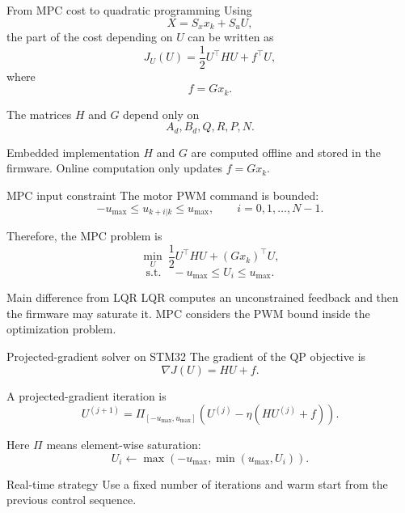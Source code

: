 \documentclass[aspectratio=169]{beamer}
\begin{document}
\begin{frame}{From MPC cost to quadratic programming}
Using
\[
X=S_xx_k+S_uU,
\]
the part of the cost depending on $U$ can be written as
\[
J_U(U)=\frac12U^\top HU+f^\top U,
\]
where
\[
f=Gx_k.
\]

\vspace{0.2cm}

The matrices $H$ and $G$ depend only on
\[
A_d,
B_d,
Q,
R,
P,
N.
\]

\vspace{0.15cm}
\begin{block}{Embedded implementation}
\small
$H$ and $G$ are computed offline and stored in the firmware. Online computation only updates $f=Gx_k$.
\end{block}
\end{frame}

\begin{frame}{MPC input constraint}
The motor PWM command is bounded:
\[
-u_{\max}\le u_{k+i|k}\le u_{\max},
\qquad i=0,1,\ldots,N-1.
\]

Therefore, the MPC problem is
\[
\min_U\ \frac12U^\top HU+(Gx_k)^\top U,
\]
\[
\mathrm{s.t.}\quad
-u_{\max}\le U_i\le u_{\max}.
\]

\vspace{0.15cm}
\begin{block}{Main difference from LQR}
\small
LQR computes an unconstrained feedback and then the firmware may saturate it. MPC considers the PWM bound inside the optimization problem.
\end{block}
\end{frame}

\begin{frame}{Projected-gradient solver on STM32}
The gradient of the QP objective is
\[
\nabla J(U)=HU+f.
\]

A projected-gradient iteration is
\[
U^{(j+1)}=
\Pi_{[-u_{\max},u_{\max}]}
\left(
U^{(j)}-\eta(HU^{(j)}+f)
\right).
\]

\vspace{0.15cm}

Here $\Pi$ means element-wise saturation:
\[
U_i\leftarrow \max(-u_{\max},\min(u_{\max},U_i)).
\]

\vspace{0.15cm}
\begin{block}{Real-time strategy}
\small
Use a fixed number of iterations and warm start from the previous control sequence.
\end{block}
\end{frame}
\end{document}
